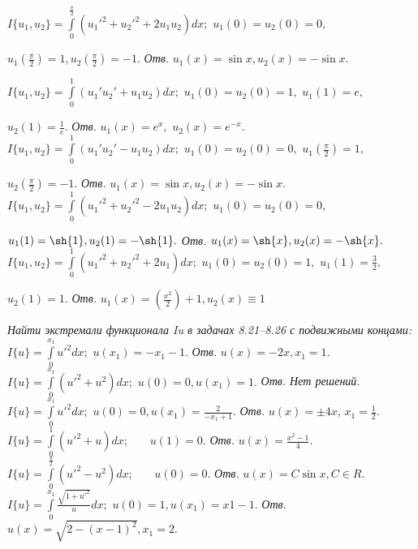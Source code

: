 	\zadanie
	$I\{u_1,u_2\}= \int\limits_0^{\frac{\pi}{2}}(u_1'^2+u_2'^2+2u_1u_2)dx;$ \hfill $u_1(0)=u_2(0)=0,$

	\noindent
	$u_1(\frac{\pi}{2})=1, u_2(\frac{\pi}{2})=-1.$ {\it Отв.} $u_1(x)=\sin{x}, u_2(x)=-\sin{x}.$

	\newpage
	\vspace{2mm}
	\zadanie
		$I\{u_1,u_2\}= \int\limits_0^1 (u_1'u_2'+u_1u_2)dx;$ \hfill $u_1(0)=u_2(0)=1,$ 	\hfill $u_1(1)=e,$

	\noindent
	$u_2(1)=\frac{1}{e}.$ {\it Отв.} $u_1(x)=e^x,$ $u_2(x)=e^{-x}.$
	\vspace{2mm}
	\zadanie
		$I\{u_1,u_2\}= \int\limits_0^1 (u_1'u_2'- u_1u_2)dx;$ \hfill $u_1(0)=u_2(0)=0,$ 	\hfill $u_1(\frac{\pi}{2})=1,$

	\noindent
	$u_2(\frac{\pi}{2})=-1.$ {\it Отв.} $u_1(x)=\sin{x}, u_2(x)=-\sin{x}.$
	\vspace{2mm}
	\zadanie
	$I\{u_1,u_2\}= \int\limits_0^1 (u_1'^2+u_2'^2-2u_1u_2)dx;$ \hfill $u_1(0)=u_2(0)=0,$

	\noindent
	$u_1(1)=\sh{1}, u_2(1)=-\sh{1}.$ {\it Отв.} $u_1(x)=\sh{x}, u_2(x)=-\sh{x}.$
	\vspace{2mm}
	\zadanie
	$I\{u_1,u_2\}=\int\limits_0^1 (u_1'^2+u_2'^2+2u_1)dx;$ \hfill $u_1(0)=u_2(0)=1,$ \hfill $u_1(1)=\frac{3}{2},$

	\noindent
	$u_2(1)=1.$ {\it Отв.} $u_1(x)=(\frac{x^2}{2})+1, u_2(x)\equiv 1$
	\vspace{4mm}

	{\it Найти экстремали функционала I{u} в задачах 8.21–8.26 с подвижными концами:}
	\vspace{4mm}
	\zadanie
		$I\{u\}=\int\limits_0^{x_1} u'^2dx;$ \hfill $u(x_1)=-x_1 -1.$ {\it Отв.} $u(x)=-2x, x_1=1.$
	\vspace{2mm}
	\zadanie
		$I\{u\}= \int\limits_0^{x_1} (u'^2 + u^2)dx;$ \hfill $u(0)=0, u(x_1)=1.$ {\it Отв. Нет решений.}
	\vspace{2mm}
	\zadanie
	$I\{u\}= \int\limits_0^{x_1} u'^2dx;$ \hfill $u(0)=0, u(x_1)=\frac{2}{-x_1+1}.$ {\it Отв.} $u(x)=\pm4x$, $x_1=\frac{1}{2}.$
	\vspace{2mm}
	\zadanie
	$I\{u\}= \int\limits_0^1 (u'^2+u)dx;$ \, \, \, $u(1)=0.$ {\it Отв.} $u(x)=\frac{x^2-1}{4}.$
	\vspace{2mm}
	\zadanie
	$I\{u\}= \int\limits_0^\frac{\pi}{2} (u'^2-u^2)dx;$ \, \, \, $u(0)=0.$ {\it Отв.} $u(x)=C\sin{x}, C \in R.$
	\vspace{2mm}
	\zadanie
	$I\{u\}=\int\limits_0^{x_1} \frac{\sqrt{1+u'^2}}{u} dx;$ \hfill $u(0)=1, u(x_1)=x1 -1.$ {\it Отв.} $u(x)=\sqrt{2-(x-1)^2}, x_1=2.$

